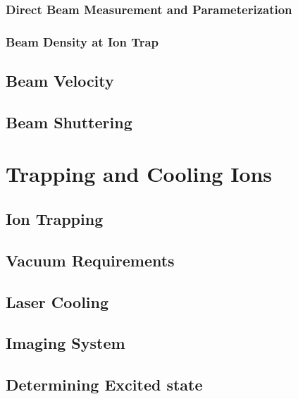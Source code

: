 \documentclass [PhD,nolistoftables,scheader] {uclathes}
\begin{document}
		\subsection{Direct Beam Measurement and Parameterization}
		
	
		\subsection{Beam Density at Ion Trap}
		
	
	\section{Beam Velocity}
	
	
	\section{Beam Shuttering}
	

\chapter{Trapping and Cooling Ions}


	\section{Ion Trapping}
	
	
	\section{Vacuum Requirements}
	
	
	\section{ Laser Cooling}
	
	
	\section{Imaging System}
	
	
	\section{Determining Excited state}
	
\end{document}

